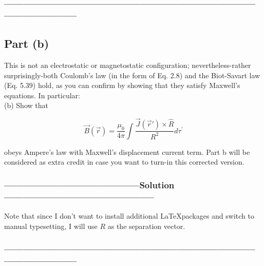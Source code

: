 \documentclass[a4paper,12pt]{article} %
\begin{document}
\subsubsection*{-----------------------------------------------------------------------------------------------------}
\subsection*{Part (b)}
This is not an electrostatic or magnetostatic configuration; nevertheless-rather surprisingly-both Coulomb's law (in the form of Eq. 2.8) and the Biot-Savart law (Eq. 5.39) hold, as you can confirm by showing that they satisfy Maxwell's equations. In particular:\\

(b) Show that

$$
\vec{B}(\vec{r})=\frac{\mu_0}{4 \pi} \int \frac{\vec{J}\left(\overrightarrow{r}'\right) \times \hat{R}}{R^2} d \tau^{\prime}
$$

obeys Ampere's law with Maxwell's displacement current term.
Part b will be considered as extra credit in case you want to turn-in this corrected version.

\subsubsection*{------------------------------------------Solution-----------------------------------------------}
Note that since I don't want to install additional \LaTeX  packages and switch to manual typesetting, I will use $R$ as the separation vector.

\subsubsection*{-----------------------------------------------------------------------------------------------------}
\end{document}
